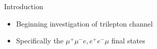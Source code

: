 \begin{frame}{Introduction}
  \begin{itemize}
    \item Beginning investigation of trilepton channel
    \item Specifically the $\mu^+\mu^-e, e^+e^-\mu$ final states
  \end{itemize}
\end{frame}
